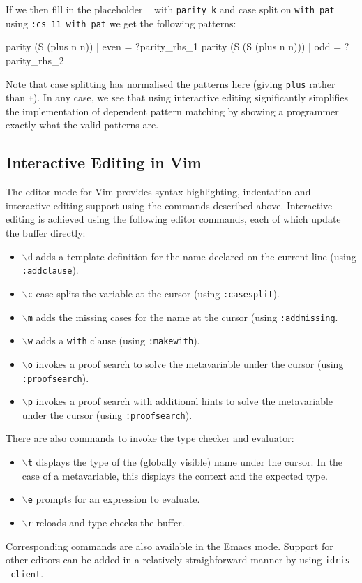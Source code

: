 \noindent
If we then fill in the placeholder \texttt{\_} with \texttt{parity k} and
case split on \texttt{with\_pat} using \texttt{:cs 11 with\_pat} we get
the following patterns:

\begin{code}
  parity (S (plus n n)) | even = ?parity_rhs_1
  parity (S (S (plus n n))) | odd = ?parity_rhs_2
\end{code}

\noindent
Note that case splitting has normalised the patterns here (giving
\texttt{plus} rather than \texttt{+}). In any case,
we see that using interactive editing significantly simplifies the
implementation of dependent pattern matching by showing a programmer exactly
what the valid patterns are.

\subsection{Interactive Editing in Vim}

The editor mode for Vim provides syntax highlighting, indentation and
interactive editing support using the commands described above. Interactive
editing is achieved using the following editor commands, each of which
update the buffer directly:

\begin{itemize}
\item \texttt{$\backslash$d} adds a template definition for the name declared
on the current line (using \texttt{:addclause}).
\item \texttt{$\backslash$c} case splits the variable at the cursor
(using \texttt{:casesplit}).
\item \texttt{$\backslash$m} adds the missing cases for the name at the
cursor (using \texttt{:addmissing}.
\item \texttt{$\backslash$w} adds a \texttt{with} clause (using
\texttt{:makewith}). 
\item \texttt{$\backslash$o} invokes a proof search to solve the metavariable
under the cursor (using \texttt{:proofsearch}).
\item \texttt{$\backslash$p} invokes a proof search with additional hints
to solve the metavariable
under the cursor (using \texttt{:proofsearch}).
\end{itemize}

\noindent
There are also commands to invoke the type checker and evaluator:

\begin{itemize}
\item \texttt{$\backslash$t} displays the type of the (globally visible) name under
the cursor. In the case of a metavariable, this displays the context and
the expected type.
\item \texttt{$\backslash$e} prompts for an expression to evaluate.
\item \texttt{$\backslash$r} reloads and type checks the buffer.
\end{itemize}

\noindent
Corresponding commands are also available in the Emacs mode. Support for
other editors can be added in a relatively straighforward manner by using
\texttt{idris --client}.


